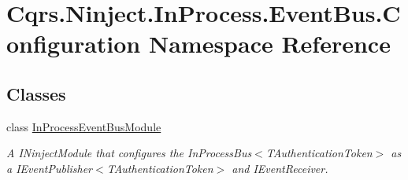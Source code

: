 \hypertarget{namespaceCqrs_1_1Ninject_1_1InProcess_1_1EventBus_1_1Configuration}{}\section{Cqrs.\+Ninject.\+In\+Process.\+Event\+Bus.\+Configuration Namespace Reference}
\label{namespaceCqrs_1_1Ninject_1_1InProcess_1_1EventBus_1_1Configuration}
\subsection*{Classes}
\begin{DoxyCompactItemize}
\item 
class \hyperlink{classCqrs_1_1Ninject_1_1InProcess_1_1EventBus_1_1Configuration_1_1InProcessEventBusModule}{In\+Process\+Event\+Bus\+Module}
\begin{DoxyCompactList}\small\item\em A I\+Ninject\+Module that configures the In\+Process\+Bus$<$\+T\+Authentication\+Token$>$ as a I\+Event\+Publisher$<$\+T\+Authentication\+Token$>$ and I\+Event\+Receiver. \end{DoxyCompactList}\end{DoxyCompactItemize}
